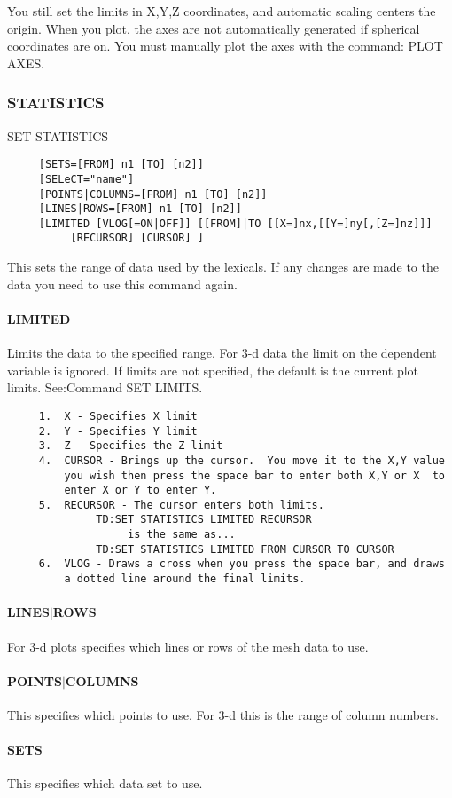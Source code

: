 You  still  set  the limits in X,Y,Z coordinates, and automatic scaling
centers the origin.  When you plot,  the  axes  are  not  automatically
generated  if spherical coordinates are on.  You must manually plot the
axes with the command:  PLOT AXES.  
\subsubsection{STATISTICS}
SET STATISTICS 
\begin{verbatim}
     [SETS=[FROM] n1 [TO] [n2]] 
     [SELeCT="name"] 
     [POINTS|COLUMNS=[FROM] n1 [TO] [n2]] 
     [LINES|ROWS=[FROM] n1 [TO] [n2]] 
     [LIMITED [VLOG[=ON|OFF]] [[FROM]|TO [[X=]nx,[[Y=]ny[,[Z=]nz]]]
          [RECURSOR] [CURSOR] ] 
\end{verbatim}
This  sets  the range of data used by the lexicals.  If any changes are
made to the data you need to use this command again.  
\paragraph{LIMITED}
Limits  the  data  to the specified range.  For 3-d data the limit on
the dependent variable is ignored.  If limits are not specified,  the
default is the current plot limits.  See:Command SET LIMITS.  
\begin{verbatim}
     1.  X - Specifies X limit 
     2.  Y - Specifies Y limit 
     3.  Z - Specifies the Z limit 
     4.  CURSOR - Brings up the cursor.  You move it to the X,Y value
         you wish then press the space bar to enter both X,Y or X  to
         enter X or Y to enter Y.  
     5.  RECURSOR - The cursor enters both limits.  
              TD:SET STATISTICS LIMITED RECURSOR 
                   is the same as...  
              TD:SET STATISTICS LIMITED FROM CURSOR TO CURSOR 
     6.  VLOG - Draws a cross when you press the space bar, and draws
         a dotted line around the final limits.  
\end{verbatim}
\paragraph{LINES$|$ROWS}
For 3-d plots specifies which lines or rows of the mesh data to use. 
\paragraph{POINTS$|$COLUMNS}
This  specifies  which  points  to use.  For 3-d this is the range of
column numbers.  
\paragraph{SETS}
This specifies which data set to use.  
